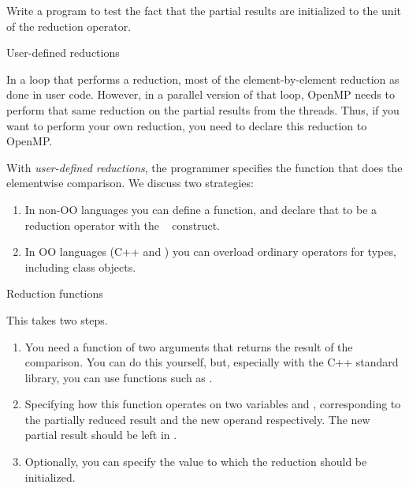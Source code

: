 \begin{exercise}
  Write a program to test the fact that the partial results
  are initialized to the unit of the reduction operator.
\end{exercise}

 {User-defined reductions}

In a loop that performs a reduction,
most of the element-by-element reduction as done in user code.
However, in a parallel version of that loop,
OpenMP needs to perform that same reduction on the partial results
from the threads.
Thus, if you want to perform your own reduction,
you need to declare this reduction to OpenMP.

With \emph{user-defined reductions}, the programmer specifies the
function that does the elementwise comparison.
We discuss two strategies:
\begin{enumerate}
\item In non-\ac{OO} languages you can define a function,
  and declare that to be a reduction operator with the
  ~ construct.
\item In \ac{OO} languages (C++ and )
  you can overload ordinary operators for types, including class objects.
\end{enumerate}

 {Reduction functions}

This takes two steps.
\begin{enumerate}
\item You need a function of two arguments that returns the result of
  the comparison. You can do this yourself, but, especially with the
  C++ standard library, you can use functions such as .
\item Specifying how this function operates on two variables
   and , corresponding to the
  partially reduced result and the new operand respectively. The new
  partial result should be left in .
\item Optionally, you can specify the value to which the reduction
  should be initialized.
\end{enumerate}

